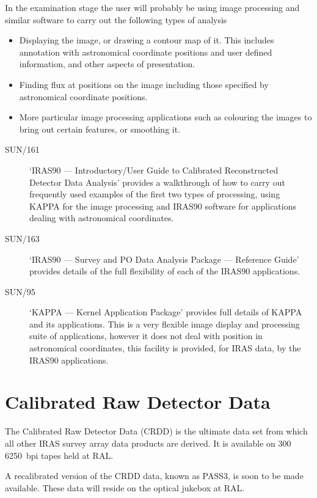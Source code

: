 In the examination stage the user will probably be using image processing and
similar software to carry out the following types of analysis
\begin{itemize}
\item Displaying the image, or drawing a contour map of it. This includes
annotation with astronomical coordinate positions and user defined information,
and other aspects of presentation.
\item Finding flux at positions on the image including those specified by
astronomical coordinate positions.
\item More particular image processing applications such as colouring the images
to bring out certain features, or smoothing it.
\end{itemize}
\begin{description}
\item [SUN/161] `IRAS90 --- Introductory/User Guide to Calibrated Reconstructed
Detector Data Analysis' provides a walkthrough of how to carry out
frequently used examples of the first two types of processing, using KAPPA
for the image processing and IRAS90 software for applications dealing
with astronomical coordinates.
\item [SUN/163] `IRAS90 --- Survey and PO Data Analysis Package --- Reference
Guide' provides details of the full flexibility of each of the IRAS90
applications.
\item [SUN/95] `KAPPA --- Kernel Application Package' provides full details of
KAPPA and its applications. This is a very flexible image display and processing
suite of applications, however it does not deal with position in astronomical
coordinates, this facility is provided, for IRAS data, by the IRAS90
applications.
\end{description}

\section{Calibrated Raw Detector Data}
The Calibrated Raw Detector Data (CRDD) is the ultimate data set from which all
other IRAS survey array data products are derived.
It is available on 300 6250~bpi tapes held at RAL.

A recalibrated version of the CRDD data, known as PASS3, is soon to be made
available. These data will reside on the optical jukebox at RAL.

